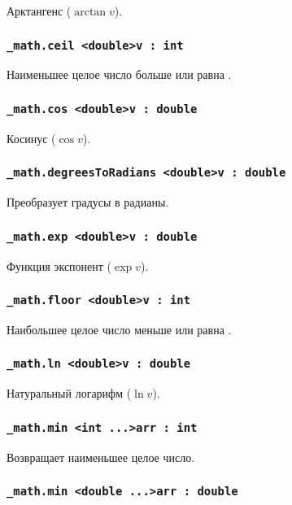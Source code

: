 Арктангенс ($\arctan{v}$).

\subsubsection{\lstinline|_math.ceil <double>v : int|}

Наименьшее целое число больше или равна .

\subsubsection{\lstinline|_math.cos <double>v : double|}

Косинус ($\cos{v}$).

\subsubsection{\lstinline|_math.degreesToRadians <double>v : double|}

Преобразует градусы в радианы.

\subsubsection{\lstinline|_math.exp <double>v : double|}

Функция экспонент ($\exp{v}$).

\subsubsection{\lstinline|_math.floor <double>v : int|}

Наибольшее целое число меньше или равна .

\subsubsection{\lstinline|_math.ln <double>v : double|}

Натуральный логарифм ($\ln{v}$).

\subsubsection{\lstinline|_math.min <int ...>arr : int|}

Возвращает наименьшее целое число.

\subsubsection{\lstinline|_math.min <double ...>arr : double|}

